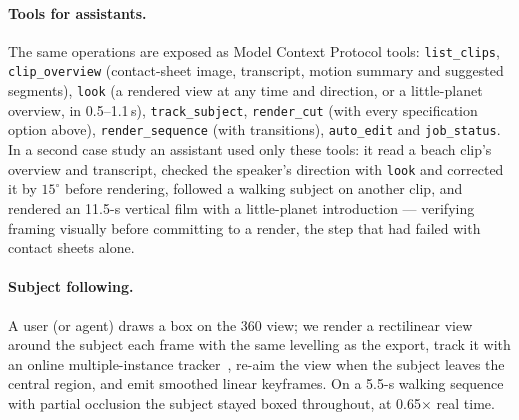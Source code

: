 \documentclass[11pt]{article}
\begin{document}
\paragraph{Tools for assistants.} The same operations are exposed as Model Context Protocol tools: \texttt{list\_clips}, \texttt{clip\_overview} (contact-sheet image, transcript, motion summary and suggested segments), \texttt{look} (a rendered view at any time and direction, or a little-planet overview, in 0.5--1.1\,s), \texttt{track\_subject}, \texttt{render\_cut} (with every specification option above), \texttt{render\_sequence} (with transitions), \texttt{auto\_edit} and \texttt{job\_status}. In a second case study an assistant used only these tools: it read a beach clip's overview and transcript, checked the speaker's direction with \texttt{look} and corrected it by $15^\circ$ before rendering, followed a walking subject on another clip, and rendered an 11.5-s vertical film with a little-planet introduction --- verifying framing visually before committing to a render, the step that had failed with contact sheets alone.

\paragraph{Subject following.} A user (or agent) draws a box on the 360\textdegree{} view; we render a rectilinear view around the subject each frame with the same levelling as the export, track it with an online multiple-instance tracker~\cite{babenko2009mil}, re-aim the view when the subject leaves the central region, and emit smoothed linear keyframes. On a 5.5-s walking sequence with partial occlusion the subject stayed boxed throughout, at 0.65$\times$ real time.
\end{document}
